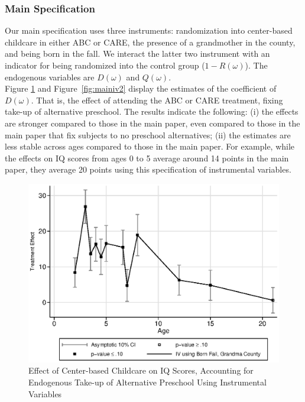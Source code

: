 \begin{appendices}
\subsubsection{Main Specification}

\noindent Our main specification uses three instruments: randomization into center-based childcare in either ABC or CARE, the presence of a grandmother in the county, and being born in the fall. We interact the latter two instrument with an indicator for being randomized into the control group ($1-R(\omega)$). The endogenous variables are $D(\omega)$ and $Q(\omega)$.\\

\noindent Figure \ref{fig:main_iv1} and Figure~\ref{fig:mainiv2} display the estimates of the coefficient of $D(\omega)$. That is, the effect of attending the ABC or CARE treatment, fixing take-up of alternative preschool. The results indicate the following: (i) the effects are stronger compared to those in the main paper, even compared to those in the main paper that fix subjects to no preschool alternatives; (ii) the estimates are less stable across ages compared to those in the main paper. For example, while the effects on IQ scores from ages 0 to 5 average around 14 points in the main paper, they average 20 points using this specification of instrumental variables.

\begin{figure}[H]
		\caption{Effect of Center-based Childcare on IQ Scores, Accounting for Endogenous Take-up of Alternative Preschool Using Instrumental Variables} \label{fig:main_iv1}
		\includegraphics[width=.7\columnwidth]{output/appendixplots/main_iv_te.eps}
\end{figure}


\end{appendices}
